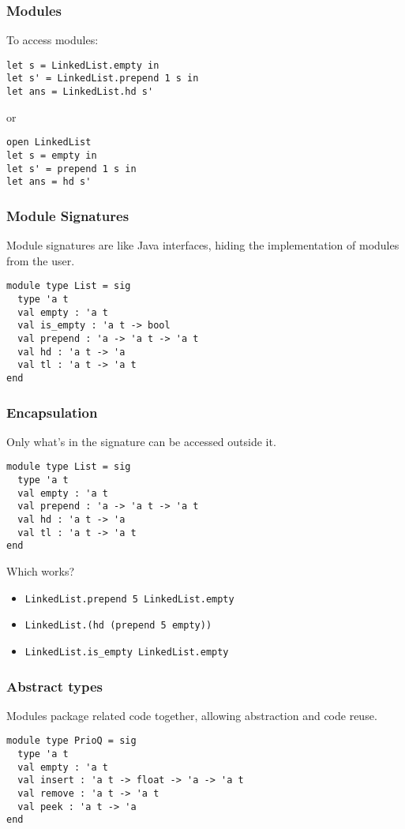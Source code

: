 \documentclass{beamer}
\newcommand{\redx}{{\color{red} \ding{55}}}
\newcommand{\greencheck}{{\color{green} \ding{51}}}
\begin{document}
\begin{frame}[fragile]
\frametitle{Modules}
To access modules:
\begin{lstlisting}
let s = LinkedList.empty in
let s' = LinkedList.prepend 1 s in
let ans = LinkedList.hd s'
\end{lstlisting}
or
\begin{lstlisting}
open LinkedList
let s = empty in
let s' = prepend 1 s in
let ans = hd s'
\end{lstlisting}
\end{frame}

\begin{frame}[fragile]
\frametitle{Module Signatures}
Module signatures are like Java interfaces, hiding the implementation of modules from the user.
\begin{lstlisting}
module type List = sig
  type 'a t
  val empty : 'a t
  val is_empty : 'a t -> bool
  val prepend : 'a -> 'a t -> 'a t
  val hd : 'a t -> 'a
  val tl : 'a t -> 'a t
end
\end{lstlisting}
\end{frame}

\begin{frame}[fragile]
\frametitle{Encapsulation}
Only what's in the signature can be accessed outside it.
\begin{lstlisting}
module type List = sig
  type 'a t
  val empty : 'a t
  val prepend : 'a -> 'a t -> 'a t
  val hd : 'a t -> 'a
  val tl : 'a t -> 'a t
end
\end{lstlisting}

Which works? \pause
\begin{itemize}
\item \verb|LinkedList.prepend 5 LinkedList.empty| \pause \greencheck \pause
\item \verb|LinkedList.(hd (prepend 5 empty))| \pause \greencheck \pause
\item \verb|LinkedList.is_empty LinkedList.empty| \pause \redx
\end{itemize}
\end{frame}

\begin{frame}[fragile]
\frametitle{Abstract types}
Modules package related code together, allowing abstraction and code reuse.
\begin{lstlisting}
module type PrioQ = sig
  type 'a t
  val empty : 'a t
  val insert : 'a t -> float -> 'a -> 'a t
  val remove : 'a t -> 'a t
  val peek : 'a t -> 'a
end
\end{lstlisting}
\end{frame}
\end{document}
